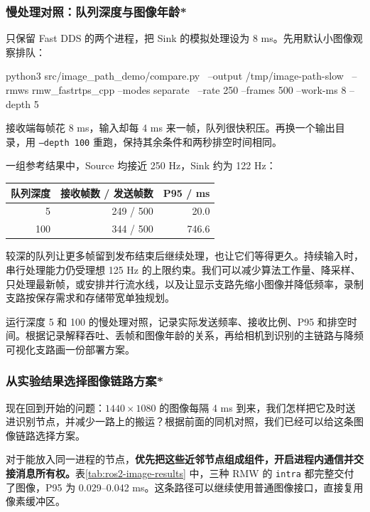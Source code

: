 \subsubsection{慢处理对照：队列深度与图像年龄*}
只保留 Fast DDS 的两个进程，把 Sink 的模拟处理设为 8 ms。先用默认小图像观察排队：
\par\medskip\noindent\begin{minipage}{\linewidth}
\begin{tbash}
python3 src/image_path_demo/compare.py \
  --output /tmp/image-path-slow \
  --rmws rmw_fastrtps_cpp --modes separate \
  --rate 250 --frames 500 --work-ms 8 --depth 5
\end{tbash}
\end{minipage}\par\smallskip
接收端每帧花 8 ms，输入却每 4 ms 来一帧，队列很快积压。再换一个输出目录，用 \texttt{--depth 100} 重跑，保持其余条件和两秒排空时间相同。

\Needspace{9\baselineskip}
一组参考结果中，Source 均接近 250 Hz，Sink 约为 122 Hz：
\begin{center}
\begin{tabular}{rrr}
\toprule
队列深度 & 接收帧数 / 发送帧数 & P95 / ms\\
\midrule
5 & 249 / 500 & 20.0\\
100 & 344 / 500 & 746.6\\
\bottomrule
\end{tabular}
\end{center}
较深的队列让更多帧留到发布结束后继续处理，也让它们等得更久。持续输入时，串行处理能力仍受理想 125 Hz 的上限约束。我们可以减少算法工作量、降采样、只处理最新帧，或安排并行流水线，以及让显示支路先缩小图像并降低频率，录制支路按保存需求和存储带宽单独规划。

\begin{exercise}
\label{ex:v2-ros-image-slow}
运行深度 5 和 100 的慢处理对照，记录实际发送频率、接收比例、P95 和排空时间。根据记录解释吞吐、丢帧和图像年龄的关系，再给相机到识别的主链路与降频可视化支路画一份部署方案。
\end{exercise}


\subsubsection{从实验结果选择图像链路方案*}
现在回到开始的问题：$1440\times1080$ 的图像每隔 4 ms 到来，我们怎样把它及时送进识别节点，并减少一路上的搬运？根据前面的同机对照，我们已经可以给这条图像链路选择方案。

对于能放入同一进程的节点，\textbf{优先把这些近邻节点组成组件，开启进程内通信并交接消息所有权。}表\ref{tab:ros2-image-results} 中，三种 RMW 的 \texttt{intra} 都完整交付了图像，P95 为 0.029--0.042 ms。这条路径可以继续使用普通图像接口，直接复用像素缓冲区。

